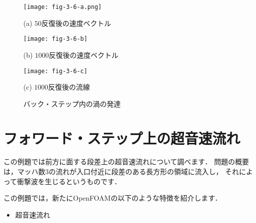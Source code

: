\begin{figure}[ht]
 \texttt{[image: fig-3-6-a.png]}\par
 \medskip
 (a) $50$反復後の速度ベクトル\par
 \bigskip
 \texttt{[image: fig-3-6-b]}\par
 \medskip
 (b) $1000$反復後の速度ベクトル\par
 \bigskip
 \texttt{[image: fig-3-6-c]}\par
 \medskip
 (c) $1000$反復後の流線\par
 \medskip
 \caption{バック・ステップ内の渦の発達}
 \label{fig:3.6}
\end{figure}



\section{フォワード・ステップ上の超音速流れ}
\label{sec:3.3}
%
%
この例題では前方に面する段差上の超音速流れについて調べます．
問題の概要は，マッハ数$3$の流れが入口付近に段差のある長方形の領域に流入し，
それによって衝撃波を生じるというものです．

この例題では，新たにOpenFOAMの以下のような特徴を紹介します．
\begin{itemize}
 \item 超音速流れ
\end{itemize}


